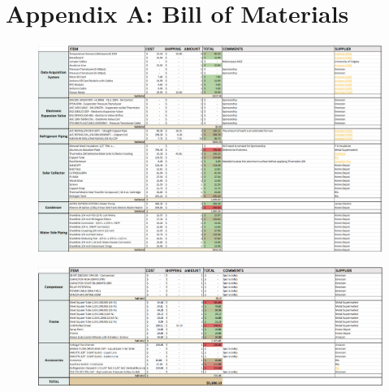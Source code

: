 \chapter{Appendix A: Bill of Materials}

\begin{figure}[H]
    \centering
    \includegraphics[width=15cm]{images/bom1.png}
\end{figure}
\begin{figure}[H]
    \centering
    \includegraphics[width=15cm]{images/bom2.png}
\end{figure}

